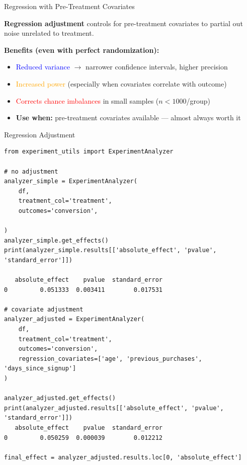 \documentclass{beamer}
\newcommand{\blue}[1]{\textcolor{blue}{#1}}
\newcommand{\red}[1]{\textcolor{red}{#1}}
\newcommand{\orange}[1]{\textcolor{orange}{#1}}
\begin{document}
\begin{frame}{Regression with Pre-Treatment Covariates }

\textbf{Regression adjustment} controls for pre-treatment covariates to partial out noise unrelated to treatment.

\textbf{Benefits (even with perfect randomization):}
\begin{itemize}
    \item \blue{Reduced variance} $\rightarrow$ narrower confidence intervals, higher precision
    \item \orange{Increased power} (especially when covariates correlate with outcome)
    \item \red{Corrects chance imbalances} in small samples ($n < 1000$/group)
    \item \textbf{Use when:} pre-treatment covariates available --- almost always worth it
\end{itemize}

\end{frame}
\begin{frame}[fragile]{Regression Adjustment }

\begin{verbatim}
from experiment_utils import ExperimentAnalyzer

# no adjustment
analyzer_simple = ExperimentAnalyzer(
    df,
    treatment_col='treatment',
    outcomes='conversion',

)
analyzer_simple.get_effects()
print(analyzer_simple.results[['absolute_effect', 'pvalue', 'standard_error']])

   absolute_effect    pvalue  standard_error
0         0.051333  0.003411        0.017531

# covariate adjustment
analyzer_adjusted = ExperimentAnalyzer(
    df,
    treatment_col='treatment',
    outcomes='conversion',
    regression_covariates=['age', 'previous_purchases', 'days_since_signup']
)

analyzer_adjusted.get_effects()
print(analyzer_adjusted.results[['absolute_effect', 'pvalue', 'standard_error']])
   absolute_effect    pvalue  standard_error
0         0.050259  0.000039        0.012212

final_effect = analyzer_adjusted.results.loc[0, 'absolute_effect']

\end{verbatim}


\end{frame}
\end{document}
